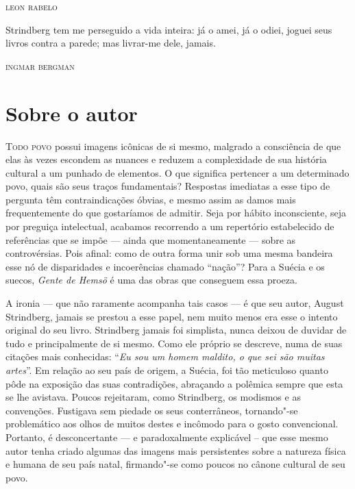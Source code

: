 
\begin{flushright}
\textsc{leon rabelo}\bigskip
\end{flushright}

\epigraph{Strindberg tem me perseguido a vida inteira: já o amei, já o odiei, 
joguei seus livros contra a parede; mas livrar-me dele, jamais.}{\textsc{ingmar bergman}}

\section{Sobre o autor}


\noindent\textsc{Todo povo} possui imagens icônicas de si mesmo, 
malgrado a consciência de que elas às vezes escondem as nuances e 
reduzem a complexidade de sua história cultural a um punhado de elementos. 
O que significa pertencer a um determinado povo, quais são seus traços fundamentais? 
Respostas imediatas a esse tipo de pergunta têm contraindicações óbvias, e
mesmo assim as damos mais frequentemente do que gostaríamos de admitir.
Seja por hábito inconsciente, seja por preguiça intelectual, acabamos
recorrendo a um repertório estabelecido de referências que se impõe --- ainda que
momentaneamente --- sobre as controvérsias.  Pois afinal: como de outra
forma unir sob uma mesma bandeira esse nó de disparidades e
incoerências chamado “nação”?  Para a Suécia e os suecos, 
\textit{Gente de Hemsö} é uma das obras que conseguem essa proeza. 

A ironia --- que não raramente acompanha tais casos --- é que seu autor,
August Strindberg, jamais se prestou a esse papel, nem muito menos era
esse o intento original do seu livro. Strindberg jamais foi simplista,
nunca deixou de duvidar de tudo e principalmente de si mesmo. Como ele
próprio se descreve, numa de suas citações mais conhecidas: ``\textit{Eu
sou um homem maldito, o que sei são muitas artes}''. Em relação ao seu
país de origem, a Suécia, foi tão meticuloso quanto pôde na exposição
das suas contradições, abraçando a polêmica sempre que esta se lhe
avistava. Poucos rejeitaram, como Strindberg, os modismos e as
convenções. Fustigava sem piedade os seus conterrâneos, tornando"-se
problemático aos olhos de muitos destes e incômodo para o gosto
convencional. Portanto, é desconcertante --- e paradoxalmente explicável
– que esse mesmo autor tenha criado algumas das imagens mais
persistentes sobre a natureza física e humana de seu país natal, 
firmando"-se como poucos no cânone cultural de seu povo. 

